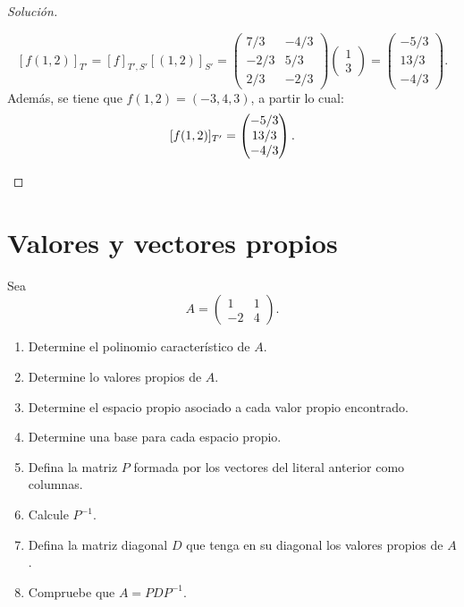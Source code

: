 \documentclass[a4,11pt]{aleph-notas}
\begin{document}
\begin{proof}[Solución]
\begin{enumerate}
    \[
        [f(1, 2)]_{T'} = [f]_{T',S'}[(1, 2)]_{S'} = \begin{pmatrix}
            7/3 & -4/3\\
            -2/3 & 5/3\\
            2/3 & -2/3
        \end{pmatrix}
        \begin{pmatrix}
            1\\
            3
        \end{pmatrix}
        =
        \begin{pmatrix}
            -5/3\\
            13/3\\
            -4/3
        \end{pmatrix}.
    \]
    Además, se tiene que $f(1, 2) = (-3, 4, 3)$, a partir lo cual:
    \[
        [f(1, 2)]_{T'} = 
        \begin{pmatrix}
            -5/3\\
            13/3\\
            -4/3
        \end{pmatrix}. \qedhere
    \]
\end{enumerate}
\end{proof}

\section{Valores y vectores propios}

\begin{ejer}
    Sea 
    \[
        A = \begin{pmatrix}
            1 & 1 \\
            -2 & 4
        \end{pmatrix}.
    \]
    \begin{enumerate}
    \item
        Determine el polinomio característico de $A$.
    \item
        Determine lo valores propios de $A$.
    \item
        Determine el espacio propio asociado a cada valor propio encontrado.
    \item
        Determine una base para cada espacio propio.
    \item
        Defina la matriz $P$ formada por los vectores del literal anterior como columnas.
    \item
        Calcule $P^{-1}$.
    \item
        Defina la matriz diagonal $D$ que tenga en su diagonal los valores propios de $A$.
    \item
        Compruebe que $A = P D P^{-1}$.
    \end{enumerate}
\end{ejer}
\end{document}
